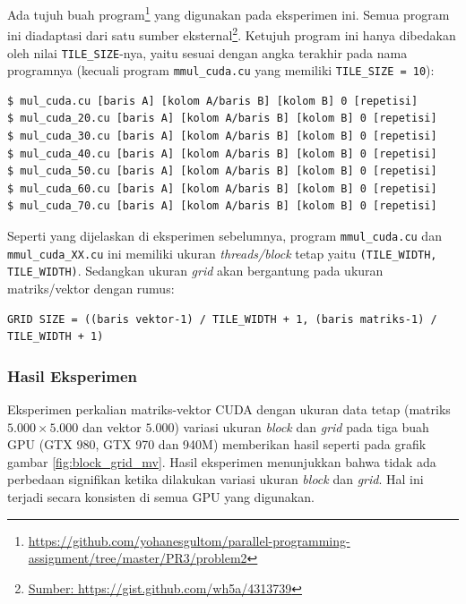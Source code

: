 Ada tujuh buah program\footnote{\url{https://github.com/yohanesgultom/parallel-programming-assignment/tree/master/PR3/problem2}} yang digunakan pada eksperimen ini. Semua program ini diadaptasi dari satu sumber eksternal\footnote{\url{Sumber: https://gist.github.com/wh5a/4313739}}. Ketujuh program ini hanya dibedakan oleh nilai \verb|TILE_SIZE|-nya, yaitu sesuai dengan angka terakhir pada nama programnya (kecuali program \verb|mmul_cuda.cu| yang memiliki \verb|TILE_SIZE = 10|):
\begin{lstlisting}
$ mul_cuda.cu [baris A] [kolom A/baris B] [kolom B] 0 [repetisi]
$ mul_cuda_20.cu [baris A] [kolom A/baris B] [kolom B] 0 [repetisi]
$ mul_cuda_30.cu [baris A] [kolom A/baris B] [kolom B] 0 [repetisi]
$ mul_cuda_40.cu [baris A] [kolom A/baris B] [kolom B] 0 [repetisi]
$ mul_cuda_50.cu [baris A] [kolom A/baris B] [kolom B] 0 [repetisi]
$ mul_cuda_60.cu [baris A] [kolom A/baris B] [kolom B] 0 [repetisi]
$ mul_cuda_70.cu [baris A] [kolom A/baris B] [kolom B] 0 [repetisi]	
\end{lstlisting}

Seperti yang dijelaskan di eksperimen sebelumnya, program \verb|mmul_cuda.cu| dan \verb|mmul_cuda_XX.cu| ini memiliki ukuran \textit{threads/block} tetap yaitu \verb|(TILE_WIDTH, TILE_WIDTH)|. Sedangkan ukuran \textit{grid} akan bergantung pada ukuran matriks/vektor dengan rumus:

\begin{lstlisting}
GRID SIZE = ((baris vektor-1) / TILE_WIDTH + 1, (baris matriks-1) / TILE_WIDTH + 1)
\end{lstlisting}

\subsubsection{Hasil Eksperimen}

Eksperimen perkalian matriks-vektor CUDA dengan ukuran data tetap (matriks $5.000 \times 5.000$ dan vektor $5.000$) variasi ukuran \textit{block} dan \textit{grid} pada tiga buah GPU (GTX 980, GTX 970 dan 940M) memberikan hasil seperti pada grafik gambar \ref{fig:block_grid_mv}. Hasil eksperimen menunjukkan bahwa tidak ada perbedaan signifikan ketika dilakukan variasi ukuran \textit{block} dan \textit{grid}. Hal ini terjadi secara konsisten di semua GPU yang digunakan.

